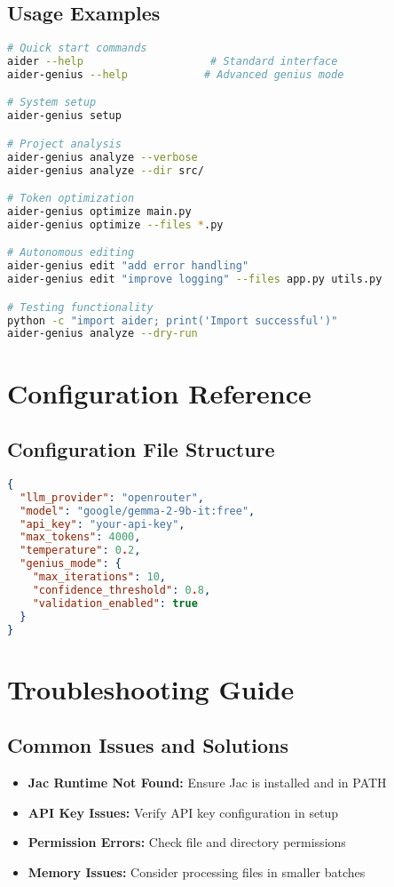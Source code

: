 \documentclass[12pt,a4paper]{article}
\begin{document}
\subsection{Usage Examples}
\begin{lstlisting}[language=bash]
# Quick start commands
aider --help                    # Standard interface
aider-genius --help            # Advanced genius mode

# System setup
aider-genius setup

# Project analysis
aider-genius analyze --verbose
aider-genius analyze --dir src/

# Token optimization
aider-genius optimize main.py
aider-genius optimize --files *.py

# Autonomous editing
aider-genius edit "add error handling"
aider-genius edit "improve logging" --files app.py utils.py

# Testing functionality
python -c "import aider; print('Import successful')"
aider-genius analyze --dry-run
\end{lstlisting}

\section{Configuration Reference}

\subsection{Configuration File Structure}
\begin{lstlisting}[language=json]
{
  "llm_provider": "openrouter",
  "model": "google/gemma-2-9b-it:free",
  "api_key": "your-api-key",
  "max_tokens": 4000,
  "temperature": 0.2,
  "genius_mode": {
    "max_iterations": 10,
    "confidence_threshold": 0.8,
    "validation_enabled": true
  }
}
\end{lstlisting}

\section{Troubleshooting Guide}

\subsection{Common Issues and Solutions}
\begin{itemize}
    \item \textbf{Jac Runtime Not Found:} Ensure Jac is installed and in PATH
    \item \textbf{API Key Issues:} Verify API key configuration in setup
    \item \textbf{Permission Errors:} Check file and directory permissions
    \item \textbf{Memory Issues:} Consider processing files in smaller batches
\end{itemize}
\end{document}
